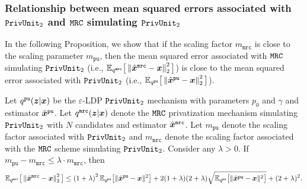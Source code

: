 \subsubsection{Relationship between mean squared errors associated with \texorpdfstring{$\texttt{PrivUnit}_2$}{PrivUnit} and \texorpdfstring{$\texttt{MRC}$}{MRC} simulating \texorpdfstring{$\texttt{PrivUnit}_2$}{PrivUnit}}\label{appendix:mrc_pu_scaling_mse}
In the following Proposition,
we show that if the scaling factor $m_{\texttt{mrc}}$ is close to the scaling parameter $m_{\texttt{pu}}$, then the mean squared error associated with $\texttt{MRC}$ simulating $\texttt{PrivUnit}_2$ (i.e., $\mathbb{E}_{q^{\texttt{mrc}}} \big[ \left\lVert  \hat{{\boldsymbol{x}}}^\texttt{mrc} - {\boldsymbol{x}} \right\rVert^2_2  \big]$) is close to the mean squared error associated with $\texttt{PrivUnit}_2$ (i.e., $\mathbb{E}_{q^{\texttt{pu}}} \big[ \left\lVert  \hat{{\boldsymbol{x}}}^\texttt{pu} - {\boldsymbol{x}} \right\rVert^2_2  \big]$).
\begin{proposition}\label{proposition:mrc_mse_wrt_privunit}
Let $q^{\texttt{pu}}({\boldsymbol{z}} | {\boldsymbol{x}})$ be the  $\varepsilon$-LDP \emph{$\texttt{PrivUnit}_2$} mechanism with parameters $p_0$ and $\gamma$ and estimator $\hat{{\boldsymbol{x}}}^{\texttt{pu}}$. Let $q^{\texttt{mrc}}({\boldsymbol{z}}|{\boldsymbol{x}})$ denote the \emph{$\texttt{MRC}$} privatization mechanism simulating \emph{$\texttt{PrivUnit}_2$} with $N$ candidates and estimator $\hat{{\boldsymbol{x}}}^{\texttt{mrc}}$.
Let $m_{\texttt{pu}}$ denote the scaling factor  associated with \emph{$\texttt{PrivUnit}_2$} and $m_\texttt{mrc}$ denote the scaling factor  associated with the \emph{$\texttt{MRC}$} scheme simulating \emph{$\texttt{PrivUnit}_2$}. Consider any $\lambda > 0$. If $m_{\texttt{pu}} - m_\texttt{mrc} \leq \lambda \cdot m_\texttt{mrc}$, then 
  \begin{align}
    \mathbb{E}_{q^{\texttt{mrc}}} \big[ \left\lVert  \hat{{\boldsymbol{x}}}^\texttt{mrc} - {\boldsymbol{x}} \right\rVert^2_2  \big]  \leq  \left( 1+\lambda \right)^2  \mathbb{E}_{q^{\texttt{pu}}}\big[\|\hat{{\boldsymbol{x}}}^{\texttt{pu}} - {\boldsymbol{x}}\|^2\big] + 2(1+\lambda)(2+\lambda) \sqrt{\mathbb{E}_{q^{\texttt{pu}}}\big[\|\hat{{\boldsymbol{x}}}^{\texttt{pu}} - {\boldsymbol{x}}\|^2\big]} + (2+\lambda)^2.
\end{align}
\end{proposition}
